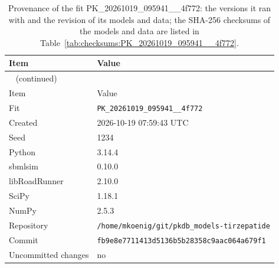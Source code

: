 \begin{longtable}{ll}
\caption{Provenance of the fit PK\_20261019\_095941\_\_4f772: the versions it ran with and the revision of its models and data; the SHA-256 checksums of the models and data are listed in Table~\ref{tab:checksums:PK_20261019_095941__4f772}.}\label{tab:provenance:PK_20261019_095941__4f772} \\
\toprule
Item & Value \\
\midrule
\endfirsthead
\multicolumn{2}{l}{\small\tablename~\thetable{} (continued)} \\
\toprule
Item & Value \\
\midrule
\endhead
\bottomrule
\endlastfoot
Fit & \texttt{PK\_20261019\_095941\_\_4f772} \\
Created & 2026-10-19 07:59:43 UTC \\
Seed & 1234 \\
Python & 3.14.4 \\
sbmlsim & 0.10.0 \\
libRoadRunner & 2.10.0 \\
SciPy & 1.18.1 \\
NumPy & 2.5.3 \\
Repository & \texttt{/home/mkoenig/git/pkdb\_models-tirzepatide} \\
Commit & \texttt{fb9e8e7711413d5136b5b28358c9aac064a679f1} \\
Uncommitted changes & no \\
\end{longtable}



